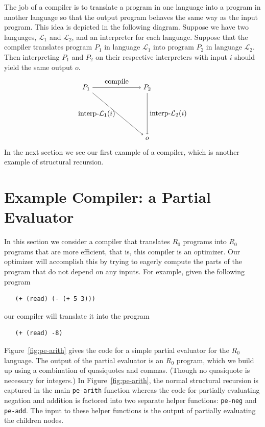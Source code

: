 \documentclass[11pt]{book}
\begin{document}
The job of a compiler is to translate a program in one language into a
program in another language so that the output program behaves the
same way as the input program. This idea is depicted in the following
diagram. Suppose we have two languages, $\mathcal{L}_1$ and
$\mathcal{L}_2$, and an interpreter for each language.  Suppose that
the compiler translates program $P_1$ in language $\mathcal{L}_1$ into
program $P_2$ in language $\mathcal{L}_2$.  Then interpreting $P_1$
and $P_2$ on their respective interpreters with input $i$ should yield
the same output $o$.
\begin{equation} \label{eq:compile-correct}
\begin{tikzpicture}[baseline=(current  bounding  box.center)]
 \node (p1) at (0,  0) {$P_1$};
 \node (p2) at (3,  0) {$P_2$};
 \node (o)  at (3, -2.5) {$o$};

 \path[->] (p1) edge [above] node {compile} (p2);
 \path[->] (p2) edge [right] node {interp-$\mathcal{L}_2$($i$)} (o);
 \path[->] (p1) edge [left]  node {interp-$\mathcal{L}_1$($i$)} (o);
\end{tikzpicture}
\end{equation}
In the next section we see our first example of a compiler, which is
another example of structural recursion.


\section{Example Compiler: a Partial Evaluator}
\label{sec:partial-evaluation}

In this section we consider a compiler that translates $R_0$
programs into $R_0$ programs that are more efficient, that is,
this compiler is an optimizer. Our optimizer will accomplish this by
trying to eagerly compute the parts of the program that do not depend
on any inputs. For example, given the following program
\begin{lstlisting}
   (+ (read) (- (+ 5 3)))
\end{lstlisting}
our compiler will translate it into the program
\begin{lstlisting}
   (+ (read) -8)
\end{lstlisting}

Figure~\ref{fig:pe-arith} gives the code for a simple partial
evaluator for the $R_0$ language. The output of the partial evaluator
is an $R_0$ program, which we build up using a combination of
quasiquotes and commas. (Though no quasiquote is necessary for
integers.) In Figure~\ref{fig:pe-arith}, the normal structural
recursion is captured in the main \texttt{pe-arith} function whereas
the code for partially evaluating negation and addition is factored
into two separate helper functions: \texttt{pe-neg} and
\texttt{pe-add}. The input to these helper functions is the output of
partially evaluating the children nodes.
\end{document}
